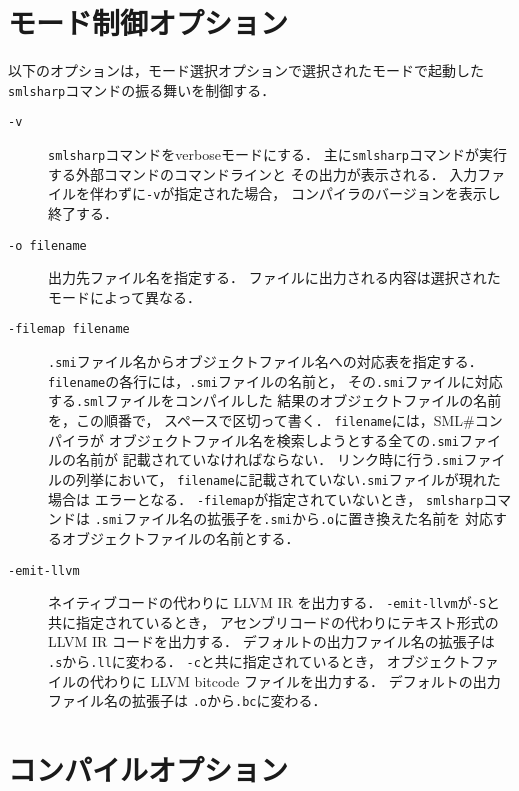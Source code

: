 \documentclass{jbook}
\newcommand{\smlsharp}{SML\#}
\newcommand{\term}[1]{\mbox{{\tt #1}}}
\begin{document}
\section{モード制御オプション}

	以下のオプションは，モード選択オプションで選択されたモードで起動した
{\tt smlsharp}コマンドの振る舞いを制御する．

\begin{description}
\item[{\tt -v}]
	{\tt smlsharp}コマンドをverboseモードにする．
	主に{\tt smlsharp}コマンドが実行する外部コマンドのコマンドラインと
その出力が表示される．
	入力ファイルを伴わずに{\tt -v}が指定された場合，
コンパイラのバージョンを表示し終了する．

\item[{\tt -o \term{filename}}]
	出力先ファイル名を指定する．
        ファイルに出力される内容は選択されたモードによって異なる．

\item[{\tt -filemap \term{filename}}]
	{\tt .smi}ファイル名からオブジェクトファイル名への対応表を指定する．
	\term{filename}の各行には，{\tt .smi}ファイルの名前と，
その{\tt .smi}ファイルに対応する{\tt .sml}ファイルをコンパイルした
結果のオブジェクトファイルの名前を，この順番で，
スペースで区切って書く．
	\term{filename}には，\smlsharp{}コンパイラが
オブジェクトファイル名を検索しようとする全ての{\tt .smi}ファイルの名前が
記載されていなければならない．
	リンク時に行う{\tt .smi}ファイルの列挙において，
\term{filename}に記載されていない{\tt .smi}ファイルが現れた場合は
エラーとなる．
	{\tt -filemap}が指定されていないとき，
{\tt smlsharp}コマンドは
{\tt .smi}ファイル名の拡張子を{\tt .smi}から{\tt .o}に置き換えた名前を
対応するオブジェクトファイルの名前とする．

\item[{\tt -emit-llvm}]
	ネイティブコードの代わりに LLVM IR を出力する．
	{\tt -emit-llvm}が{\tt -S}と共に指定されているとき，
アセンブリコードの代わりにテキスト形式の LLVM IR コードを出力する．
	デフォルトの出力ファイル名の拡張子は
{\tt .s}から{\tt .ll}に変わる．
	{\tt -c}と共に指定されているとき，
オブジェクトファイルの代わりに LLVM bitcode ファイルを出力する．
	デフォルトの出力ファイル名の拡張子は
{\tt .o}から{\tt .bc}に変わる．

\end{description}

\section{コンパイルオプション}
\end{document}
